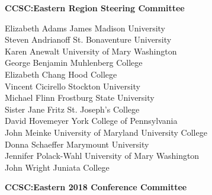 \documentclass{article}
\begin{document}
\begingroup
  \centering
  \textbf{\large CCSC:Eastern Region Steering Committee}\\
\endgroup

\vspace{10pt}

{\parindent0pt
Elizabeth Adams \dotfill James Madison University\\
Steven Andrianoff \dotfill St. Bonaventure University\\
Karen Anewalt \dotfill University of Mary Washington\\
George Benjamin \dotfill Muhlenberg College\\
Elizabeth Chang \dotfill Hood College\\
Vincent Cicirello \dotfill Stockton University\\
Michael Flinn \dotfill Frostburg State University\\
Sister Jane Fritz \dotfill St. Joseph's College\\
David Hovemeyer \dotfill York College of Pennsylvania\\
John Meinke \dotfill University of Maryland University College\\
Donna Schaeffer \dotfill Marymount University\\
Jennifer Polack-Wahl \dotfill University of Mary Washington\\
John Wright \dotfill Juniata College\\
}

\vspace{10pt}
\vspace{10pt}

\begingroup
  \centering
  \textbf{\large CCSC:Eastern 2018 Conference Committee}\\
\endgroup

\vspace{10pt}
\end{document}
